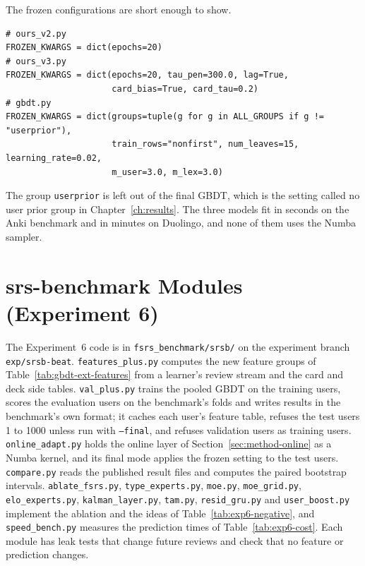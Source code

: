 The frozen configurations are short enough to show.

{\footnotesize
\begin{verbatim}
# ours_v2.py
FROZEN_KWARGS = dict(epochs=20)
# ours_v3.py
FROZEN_KWARGS = dict(epochs=20, tau_pen=300.0, lag=True,
                     card_bias=True, card_tau=0.2)
# gbdt.py
FROZEN_KWARGS = dict(groups=tuple(g for g in ALL_GROUPS if g != "userprior"),
                     train_rows="nonfirst", num_leaves=15, learning_rate=0.02,
                     m_user=3.0, m_lex=3.0)
\end{verbatim}
}

The group \texttt{userprior} is left out of the final GBDT, which is the setting called no user prior group in
Chapter~\ref{ch:results}. The three models fit in seconds on the Anki benchmark and in minutes on Duolingo, and
none of them uses the Numba sampler.

\section{srs-benchmark Modules (Experiment 6)}
\label{sec:impl-srsb}

The Experiment~6 code is in \texttt{fsrs\_benchmark/\allowbreak srsb/} on the experiment branch \texttt{exp/srsb-beat}.
\texttt{features\_plus.py} computes the new feature groups of Table~\ref{tab:gbdt-ext-features} from a learner's review stream
and the card and deck side tables. \texttt{val\_plus.py} trains the pooled GBDT on the training users, scores the
evaluation users on the benchmark's folds and writes results in the benchmark's own format; it caches each user's feature
table, refuses the test users 1 to 1000 unless run with \texttt{--final}, and refuses validation users as training users.
\texttt{online\_adapt.py} holds the online layer of Section~\ref{sec:method-online} as a Numba kernel, and its final mode
applies the frozen setting to the test users. \texttt{compare.py} reads the published result files and computes the paired
bootstrap intervals. \texttt{ablate\_fsrs.py}, \texttt{type\_experts.py}, \texttt{moe.py}, \texttt{moe\_grid.py},
\texttt{elo\_experts.py}, \texttt{kalman\_layer.py}, \texttt{tam.py}, \texttt{resid\_gru.py} and \texttt{user\_boost.py}
implement the ablation and the ideas of Table~\ref{tab:exp6-negative}, and \texttt{speed\_bench.py} measures the prediction
times of Table~\ref{tab:exp6-cost}. Each module has leak tests that change future reviews and check that no feature or
prediction changes.

